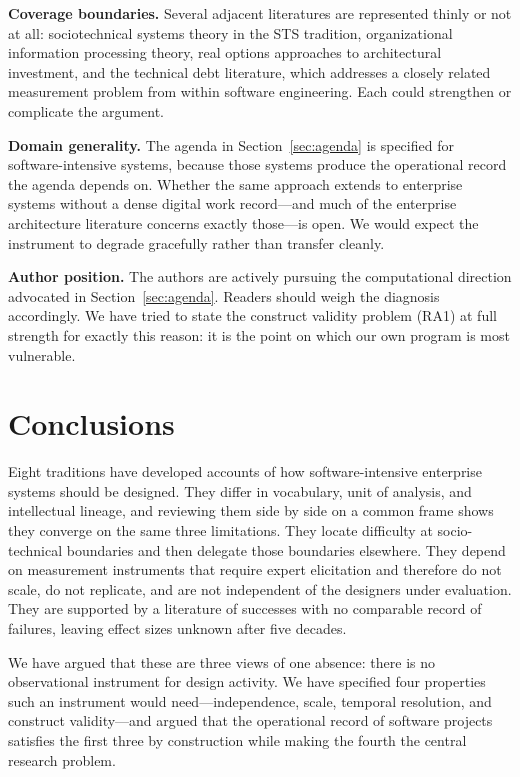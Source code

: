 \documentclass[11pt,a4paper]{article}
\begin{document}
\textbf{Coverage boundaries.} Several adjacent literatures are represented
thinly or not at all: sociotechnical systems theory in the STS tradition,
organizational information processing theory, real options approaches to
architectural investment, and the technical debt literature, which addresses a
closely related measurement problem from within software engineering. Each could
strengthen or complicate the argument.

\textbf{Domain generality.} The agenda in Section~\ref{sec:agenda} is specified
for software-intensive systems, because those systems produce the operational
record the agenda depends on. Whether the same approach extends to enterprise
systems without a dense digital work record---and much of the enterprise
architecture literature concerns exactly those---is open. We would expect the
instrument to degrade gracefully rather than transfer cleanly.

\textbf{Author position.} The authors are actively pursuing the computational
direction advocated in Section~\ref{sec:agenda}. Readers should weigh the
diagnosis accordingly. We have tried to state the construct validity problem
(RA1) at full strength for exactly this reason: it is the point on which our own
program is most vulnerable.

\section{Conclusions}
\label{sec:conclusions}

Eight traditions have developed accounts of how software-intensive enterprise
systems should be designed. They differ in vocabulary, unit of analysis, and
intellectual lineage, and reviewing them side by side on a common frame shows
they converge on the same three limitations. They locate difficulty at
socio-technical boundaries and then delegate those boundaries elsewhere. They
depend on measurement instruments that require expert elicitation and therefore
do not scale, do not replicate, and are not independent of the designers under
evaluation. They are supported by a literature of successes with no comparable
record of failures, leaving effect sizes unknown after five decades.

We have argued that these are three views of one absence: there is no
observational instrument for design activity. We have specified four properties
such an instrument would need---independence, scale, temporal resolution, and
construct validity---and argued that the operational record of software
projects satisfies the first three by construction while making the fourth the
central research problem.
\end{document}
